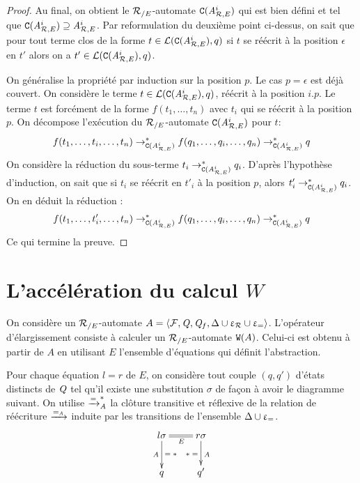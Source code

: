\begin{proof}
  
  Au final, on obtient le ${\mathcal R_{/E}}$-automate $\mathtt{C}({\mathit A}_{\mathcal R,E}^i)$ qui est bien défini et tel que $\mathtt{C}({\mathit A}_{\mathcal R,E}^i) \supseteq {\mathit A}_{\mathcal R,E}^i$.
  Par reformulation du deuxième point ci-dessus, on sait que pour tout terme clos de la forme $t \in \mathcal{L}(\mathtt{C}({\mathit A}_{\mathcal R,E}^i),q)$ si $t$ se réécrit à la position $\epsilon$
  en $t'$ alors on a $t' \in \mathcal{L}(\mathtt{C}({\mathit A}_{\mathcal R,E}^i),q)$.

  On généralise la propriété par induction sur la position $p$. Le cas $p = \epsilon$ est déjà couvert.
  On considère le terme $t \in \mathcal{L}(\mathtt{C}({\mathit A}_{\mathcal R,E}^i),q)$, réécrit à la position $i.p$. Le terme $t$
  est forcément de la forme $f(t_1, \dots, t_n)$ avec $t_i$ qui se réécrit à la position $p$.
  On décompose l'exécution du ${\mathcal R_{/E}}$-automate $\mathtt{C}({\mathit A}_{\mathcal R,E}^i)$ pour $t$:
  \[ f(t_1, \dots,t_i, \dots,t_n) \rightarrow^*_{\mathtt{C}({\mathit A}_{\mathcal R,E}^i)} f(q_1, \dots,q_i, \dots,q_n) \rightarrow^*_{\mathtt{C}({\mathit A}_{\mathcal R,E}^i)} q \]
  On considère la réduction du sous-terme $t_i \rightarrow^*_{\mathtt{C}({\mathit A}_{\mathcal R,E}^i)} q_i$. D'après l'hypothèse d'induction,
  on sait que si $t_i$ se réécrit en $t'_i$ à la position $p$, alors $t'_i\rightarrow^*_{\mathtt{C}({\mathit A}_{\mathcal R,E}^i)} q_i$. 
  On en déduit la réduction :
  \[ f(t_1, \dots, t'_i, \dots,t_n) \rightarrow^*_{\mathtt{C}({\mathit A}_{\mathcal R,E}^i)} f(q_1, \dots,q_i, \dots,q_n) \rightarrow^*_{\mathtt{C}({\mathit A}_{\mathcal R,E}^i)} q \]
  Ce qui termine la preuve.
\end{proof}


\section{L'accélération du calcul $W$}

On considère un ${\mathcal R_{/E}}$-automate $A = \langle \mathcal{F}, \mathit Q, \mathit Q_f, \Delta \cup \upvarepsilon_{\mathcal R}
\cup \upvarepsilon_{=} \rangle$. L'opérateur d'élargissement consiste à calculer un 
${\mathcal R_{/E}}$-automate $\mathtt{W}(A)$. Celui-ci est obtenu à partir de $A$ en utilisant $E$
l'ensemble d'équations qui définit l'abstraction.

Pour chaque équation $l = r$ de $E$, on considère tout couple
$(q, q')$ d'états distincts de $\mathit Q$ tel qu'il existe une
substitution $\sigma$ de façon à avoir le diagramme suivant.
On utilise $\xrightarrow{=}^*_\mathit A$ la clôture transitive et réflexive
de la relation de réécriture $\xrightarrow{=_\mathit A}$ induite par les transitions de l'ensemble $\Delta \cup \upvarepsilon_{=}$.  
\[\xymatrix{
  l\sigma \ar@{=}[r]_{E}\ar[d]^{=\; *}_{\A} & r\sigma \ar[d]^{\A}_{*\; =}\\
  q & q'
}\]

